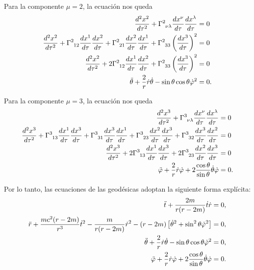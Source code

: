 \documentclass[letterpaper,11pt]{article}
\begin{document}
Para la componente $\mu = 2$, la ecuación nos queda\begin{align}
\frac{d^2 x^{2}}{d\tau^2} + \Gamma\indices{^2_{\nu \lambda}} \frac{dx^{\nu}}{d\tau} \frac{dx^{\lambda}}{d\tau} &= 0 \\
    \frac{d^2 x^{2}}{d\tau^2} +  \Gamma\indices{^2_{12}}  \frac{dx^{1}}{d\tau} \frac{dx^{2}}{d\tau} +  \Gamma\indices{^2_{21}}  \frac{dx^{2}}{d\tau} \frac{dx^{1}}{d\tau} + \Gamma\indices{^2_{33}} \left( \frac{dx^{3}}{d\tau} \right)^2  &= 0 \\
    \frac{d^2 x^{2}}{d\tau^2} +  2 \Gamma\indices{^2_{12}}  \frac{dx^{1}}{d\tau} \frac{dx^{2}}{d\tau} + \Gamma\indices{^2_{33}} \left( \frac{dx^{3}}{d\tau} \right)^2  &= 0 \\
\Ddot{\theta} + \frac{2}{r} \dot{r} \dot{\theta} - \sin\theta\cos\theta \dot{\varphi}^2 &= 0.
\end{align}

Para la componente $\mu = 3$, la ecuación nos queda\begin{align}
\frac{d^2 x^{3}}{d\tau^2} + \Gamma\indices{^3_{\nu \lambda}} \frac{dx^{\nu}}{d\tau} \frac{dx^{\lambda}}{d\tau} &= 0 \\
    \frac{d^2 x^{3}}{d\tau^2} +  \Gamma\indices{^3_{13}}  \frac{dx^{1}}{d\tau} \frac{dx^{3}}{d\tau} +   \Gamma\indices{^3_{31}}  \frac{dx^{3}}{d\tau} \frac{dx^{1}}{d\tau} + \Gamma\indices{^3_{23}}  \frac{dx^{2}}{d\tau} \frac{dx^{3}}{d\tau} + \Gamma\indices{^3_{32}}  \frac{dx^{3}}{d\tau} \frac{dx^{2}}{d\tau}  &= 0 \\
    \frac{d^2 x^{3}}{d\tau^2} +  2 \Gamma\indices{^3_{13}}  \frac{dx^{1}}{d\tau} \frac{dx^{3}}{d\tau}  + 2\Gamma\indices{^3_{23}}  \frac{dx^{2}}{d\tau} \frac{dx^{3}}{d\tau}   &= 0 \\
    \Ddot{\varphi} + \frac{2}{r} \dot{r}\dot{\varphi} + 2 \frac{\cos\theta}{\sin \theta} \dot{\theta} \dot{\varphi} &= 0.
\end{align}

Por lo tanto, las ecuaciones de las geodésicas adoptan la siguiente forma explícita:
\begin{align}
\Ddot{t} +  \frac{2m}{r(r-2m)} \dot{t} \dot{r}&= 0, \label{eq:geod-time-1} \\    \Ddot{r} + \frac{mc^2(r-2m)}{r^3} \dot{t}^2 - \frac{m}{r(r-2m)} \dot{r}^2 - (r-2m) \left[\dot{\theta}^2 + \sin^2\theta \dot{\varphi}^2 \right]  &= 0, \label{eq:geod-time-2} \\
\Ddot{\theta} + \frac{2}{r} \dot{r} \dot{\theta} - \sin\theta\cos\theta \dot{\varphi}^2 &= 0, \label{eq:geod-time-3} \\
 \Ddot{\varphi} + \frac{2}{r} \dot{r}\dot{\varphi} + 2 \frac{\cos\theta}{\sin \theta} \dot{\theta} \dot{\varphi} &= 0. \label{eq:geod-time-4}
\end{align}
\end{document}
